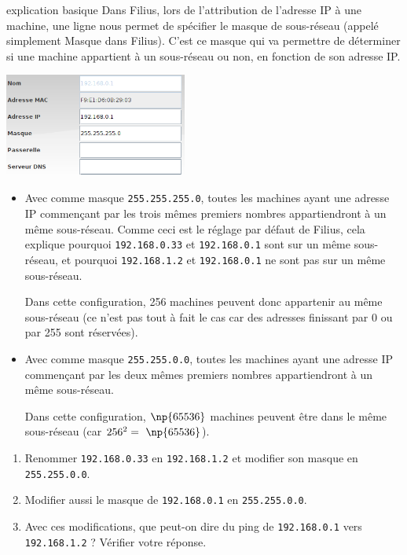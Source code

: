 \documentclass[a4paper,dvipsnames]{article}
\begin{document}
\medskip

\begin{methode}[breakable]{explication basique}{}
  Dans Filius, lors de l'attribution de l'adresse IP à une machine, une ligne nous permet de spécifier le {\color{red}masque de sous-réseau} (appelé simplement \og{}Masque\fg{} dans Filius). C'est ce masque qui va permettre de déterminer si une machine appartient à un sous-réseau ou non, en fonction de son adresse IP.

  \begin{center}
    \includegraphics[width=6cm]{img/f4.png}
  \end{center}

  \begin{itemize}
    \item Avec comme masque \texttt{255.255.255.0}, toutes les machines ayant une adresse IP commençant par les trois mêmes premiers nombres appartiendront à un même sous-réseau. Comme ceci est le réglage par défaut de Filius, cela explique pourquoi \texttt{192.168.0.33} et \texttt{192.168.0.1} sont sur un même sous-réseau, et pourquoi \texttt{192.168.1.2} et \texttt{192.168.0.1} ne sont pas sur un même sous-réseau.

      Dans cette configuration, 256 machines peuvent donc appartenir au même sous-réseau (ce n'est pas tout à fait le cas car des adresses finissant par 0 ou par 255 sont réservées).

    \item Avec comme masque \texttt{255.255.0.0}, toutes les machines ayant une adresse IP commençant par les deux mêmes premiers nombres appartiendront à un même sous-réseau.

      Dans cette configuration, $\np{65536}$ machines peuvent être dans le même sous-réseau (car $256^2=~\np{65536}$).
  \end{itemize}
\end{methode}

\medskip

\begin{activite}[breakable]{}{}
  \begin{enumerate}
    \item Renommer \texttt{192.168.0.33} en \texttt{192.168.1.2} et modifier son masque en \texttt{255.255.0.0}.
    \item Modifier aussi le masque de \texttt{192.168.0.1} en \texttt{255.255.0.0}.
    \item Avec ces modifications, que peut-on dire du ping de \texttt{192.168.0.1} vers \texttt{192.168.1.2} ? Vérifier votre réponse.
  \end{enumerate}
\end{activite}
\end{document}
